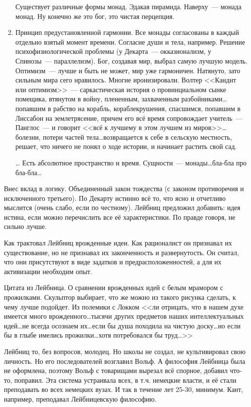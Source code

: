 \begin{enumerate}
	Существует различные формы монад. Эдакая пирамида. Наверху~--- монада монад. Ну конечно же это бог, это чистая перцепция.
	\item Принцип предустановленной гармонии. Все монады согласованы в каждый отдельно взятый момент времени. Согласие души и тела, например. Решение психофизиологической проблемы (у Декарта~--- окказионализм, у Спинозы~--- параллелизм). Бог, создавая мир, выбрал самую лучшую модель. Оптимизм~--- лучше и быть не может, мир уже гармоничен. Натянуто, зато сильным мира сего нравилось. Многие иронизировали. Волтер <<Кандит или оптимизм>>~--- саркастическая история о провинциальном сынке помещика, втянутом в войну, плененным, захваченным разбойниками\ldots попавшим в рабство на корабль, кораблекрушения, спасшимся, попавшим в Лиссабон на землетрясение, причем его всё время сопровождает учитель~--- Панглос~--- и говорит <<всё к лучшему в этом лучшем из миров>>\ldots болезни, потери частей тела\ldots возвращается к себе в сельскую местность, решает, что ничего не понял о ходе истории, и начинает растить свой сад. 
	\item[\ldots] Есть абсолютное пространство и время. Сущности~--- монады\ldots бла-бла про бла-бла\ldots 
\end{enumerate}

Внес вклад в логику. Объединенный закон тождества (с законом противоречия и исключенного третьего). По Декарту истинно всё то, что ясно и отчетливо мыслится (очень слабо, если по честному). Лейбниц предложил добавить: идея истина, если можно перечислить все её характеристики. По правде говоря, не сильно лучше.

Как трактовал Лейбниц врожденные идеи. Как рационалист он признавал их существование, но не признавал их законченность и развернутость. Он считал, что они присутствуют в виде задатков и предрасположенностей, а для их активизации необходим опыт.

Цитата из Лейбница. О сравнении врожденных идей с белым мрамором с прожилками. Скульптор выбирает, что же можно из такого рисунка сделать, к чему лучше подойдет. Из полемики с Локком
<< ли отрицать, что в нашем духе имеется много врожденного\ldots тысячи других предметов наших интеллектуальных идей\ldots не всегда осознаем их\ldots если бы душа походила на чистую доску\ldots но если бы в глыбе имелись прожилки\ldots хотя потребовался бы труд\ldots>>

Лейбниц то, без вопросов, молодец. Но школы не создал, не культивировал свою личность. Но его последователей возглавил Вольф. А философия Лейбница была не оформлена, поэтому Вольф с товарищами вырезал всё спорное, добавил что-то, поправил. Эта система устраивала всех, в т.ч. немецкие власти, и её стали преподавать во всех немецких вузах. И так в течение лет 25-30, минимум. Кант, например, преподавал Лейбницевскую философию.
 